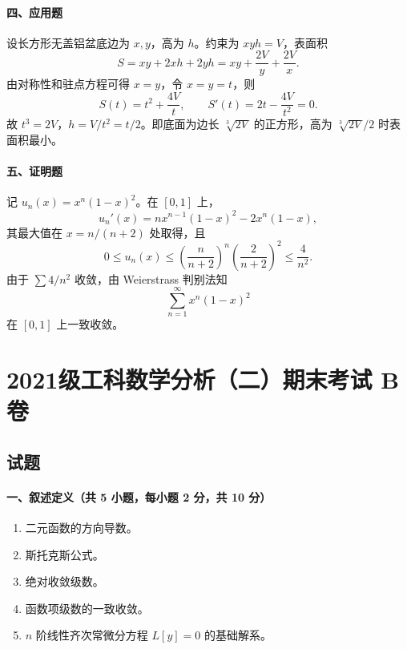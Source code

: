 \paragraph*{四、应用题}
设长方形无盖铝盆底边为 $x,y$，高为 $h$。约束为 $xyh=V$，表面积
\[
  S=xy+2xh+2yh=xy+\frac{2V}{y}+\frac{2V}{x}.
\]
由对称性和驻点方程可得 $x=y$，令 $x=y=t$，则
\[
  S(t)=t^2+\frac{4V}{t},\qquad S'(t)=2t-\frac{4V}{t^2}=0.
\]
故 $t^3=2V$，$h=V/t^2=t/2$。即底面为边长 $\sqrt[3]{2V}$ 的正方形，高为 $\sqrt[3]{2V}/2$ 时表面积最小。

\paragraph*{五、证明题}
记 $u_n(x)=x^n(1-x)^2$。在 $[0,1]$ 上，
\[
  u_n'(x)=nx^{n-1}(1-x)^2-2x^n(1-x),
\]
其最大值在 $x=n/(n+2)$ 处取得，且
\[
  0\le u_n(x)\le \left(\frac{n}{n+2}\right)^n\left(\frac{2}{n+2}\right)^2\le \frac{4}{n^2}.
\]
由于 $\sum 4/n^2$ 收敛，由 Weierstrass 判别法知
\[
  \sum_{n=1}^\infty x^n(1-x)^2
\]
在 $[0,1]$ 上一致收敛。

\section{2021级工科数学分析（二）期末考试 B 卷}

\subsection{试题}

\paragraph*{一、叙述定义（共 5 小题，每小题 2 分，共 10 分）}
\begin{enumerate}
  \item 二元函数的方向导数。
  \item 斯托克斯公式。
  \item 绝对收敛级数。
  \item 函数项级数的一致收敛。
  \item $n$ 阶线性齐次常微分方程 $L[y]=0$ 的基础解系。
\end{enumerate}

